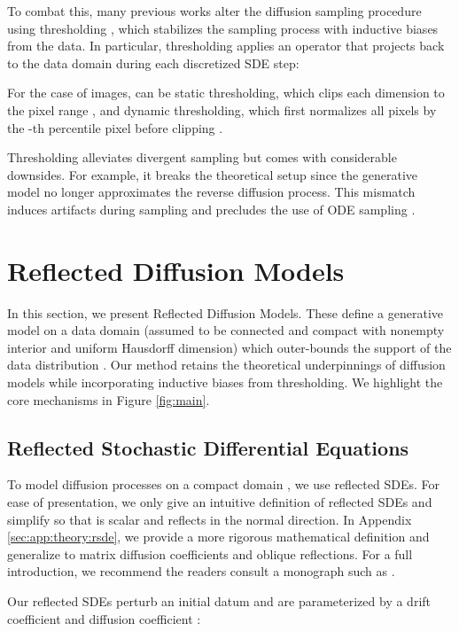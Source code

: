 \documentclass{article}
\theoremstyle{plain}
\theoremstyle{definition}
\theoremstyle{remark}
\begin{document}
To combat this, many previous works alter the diffusion sampling procedure using thresholding \citep{Saharia2022PhotorealisticTD, Li2022DiffusionLMIC}, which stabilizes the sampling process with inductive biases from the data. In particular, thresholding applies an operator  that projects back to the data domain  during each discretized SDE step:

For the case of images,  can be static thresholding, which clips each dimension to the pixel range , and dynamic thresholding, which first normalizes all pixels by the -th percentile pixel before clipping \citep{Saharia2022PhotorealisticTD}.

Thresholding alleviates divergent sampling but comes with considerable downsides. For example, it breaks the theoretical setup since the generative model no longer approximates the reverse diffusion process. This mismatch induces artifacts during sampling and precludes the use of ODE sampling \citep{Song2020ScoreBasedGM}.
 \section{Reflected Diffusion Models}\label{sec:method}

In this section, we present Reflected Diffusion Models. These define a generative model on a data domain  (assumed to be connected and compact with nonempty interior and uniform Hausdorff dimension) which outer-bounds the support of the data distribution . Our method retains the theoretical underpinnings of diffusion models while incorporating inductive biases from thresholding. We highlight the core mechanisms in Figure \ref{fig:main}.

\subsection{Reflected Stochastic Differential Equations}\label{sec:method:rsde}
To model diffusion processes on a compact domain , we use reflected SDEs. For ease of presentation, we only give an intuitive definition of reflected SDEs and simplify so that  is scalar and  reflects in the normal direction. In Appendix \ref{sec:app:theory:rsde}, we provide a more rigorous mathematical definition and generalize to matrix diffusion coefficients and oblique reflections. For a full introduction, we recommend the readers consult a monograph such as \citet{Pilipenko2014AnIT}.

Our reflected SDEs perturb an initial datum  and are parameterized by a drift coefficient  and diffusion coefficient :
\end{document}
